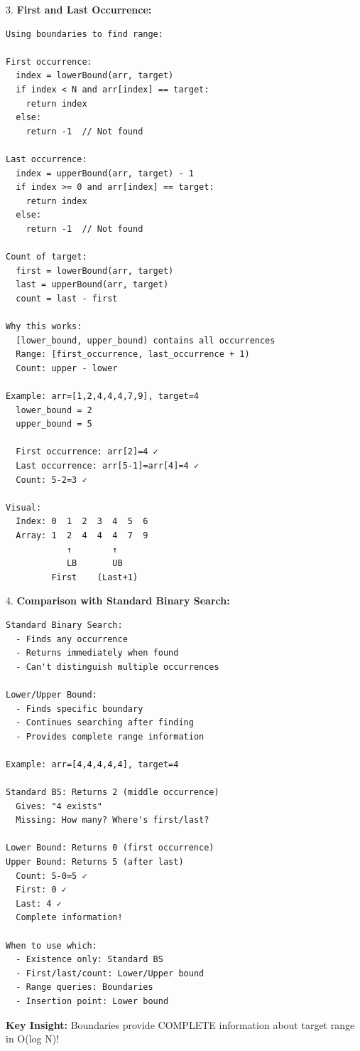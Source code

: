 \documentclass[11pt,a4paper,oneside]{book}
\begin{document}
\begin{tcolorbox}[
    enhanced,breakable,
    colback=white,
    colframe=deepblue,
    boxrule=1.5pt,
    arc=3mm,
    title=\textbf{The Boundary Search Paradigm}
]
3. \textbf{First and Last Occurrence:}
\begin{verbatim}
Using boundaries to find range:

First occurrence:
  index = lowerBound(arr, target)
  if index < N and arr[index] == target:
    return index
  else:
    return -1  // Not found

Last occurrence:
  index = upperBound(arr, target) - 1
  if index >= 0 and arr[index] == target:
    return index
  else:
    return -1  // Not found

Count of target:
  first = lowerBound(arr, target)
  last = upperBound(arr, target)
  count = last - first

Why this works:
  [lower_bound, upper_bound) contains all occurrences
  Range: [first_occurrence, last_occurrence + 1)
  Count: upper - lower

Example: arr=[1,2,4,4,4,7,9], target=4
  lower_bound = 2
  upper_bound = 5
  
  First occurrence: arr[2]=4 ✓
  Last occurrence: arr[5-1]=arr[4]=4 ✓
  Count: 5-2=3 ✓

Visual:
  Index: 0  1  2  3  4  5  6
  Array: 1  2  4  4  4  7  9
            ↑        ↑
            LB       UB
         First    (Last+1)
\end{verbatim}

4. \textbf{Comparison with Standard Binary Search:}
\begin{verbatim}
Standard Binary Search:
  - Finds any occurrence
  - Returns immediately when found
  - Can't distinguish multiple occurrences

Lower/Upper Bound:
  - Finds specific boundary
  - Continues searching after finding
  - Provides complete range information

Example: arr=[4,4,4,4,4], target=4

Standard BS: Returns 2 (middle occurrence)
  Gives: "4 exists"
  Missing: How many? Where's first/last?

Lower Bound: Returns 0 (first occurrence)
Upper Bound: Returns 5 (after last)
  Count: 5-0=5 ✓
  First: 0 ✓
  Last: 4 ✓
  Complete information!

When to use which:
  - Existence only: Standard BS
  - First/last/count: Lower/Upper bound
  - Range queries: Boundaries
  - Insertion point: Lower bound
\end{verbatim}

\textbf{Key Insight:}
Boundaries provide COMPLETE information about target range in O(log N)!
\end{tcolorbox}
\end{document}
